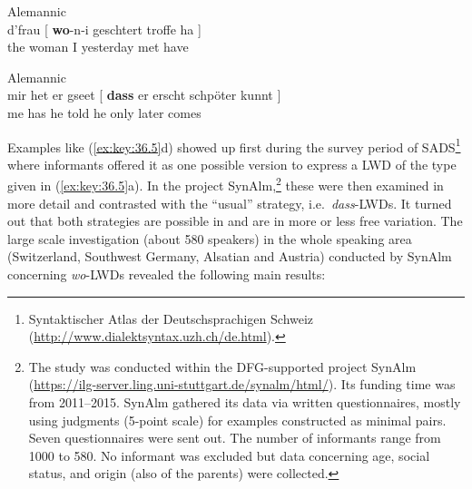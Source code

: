 \documentclass[output=paper]{langsci/langscibook}
\begin{document}
\ea\label{ex:key:36.6} Alemannic\\
    \gll d'frau [ \textbf{wo}-n-i geschtert \underline{\hphantom{2em}} troffe ha ] \\
    {the woman} {} {\Rci{}\hphantom{-n-}I} yesterday met have \\
\z

\ea\label{ex:key:36.7} Alemannic\\
    \gll mir het er gseet [ \textbf{dass} er erscht schpöter kunnt ]\\
        me has he told {} \Cci{} he only later comes \\
\z

Examples like (\ref{ex:key:36.5}d) showed up first during the survey period of
SADS\footnote{Syntaktischer Atlas der Deutschsprachigen Schweiz
(\url{http://www.dialektsyntax.uzh.ch/de.html}).} where informants offered it
as one possible version to express a \gls{LWD} of the type given in
(\ref{ex:key:36.5}a). In the project SynAlm,\footnote{The study was conducted
    within the DFG-supported project SynAlm {\sloppy
    (\url{https://ilg-server.ling.uni-stuttgart.de/synalm/html/})}. Its funding
    time was from 2011--2015. SynAlm gathered its data via written
    questionnaires, mostly using judgments (5-point scale) for examples
    constructed as minimal pairs. Seven questionnaires were sent out. The
number of informants range from 1000 to 580. No informant was excluded but data
concerning age, social status, and origin (also of the parents) were
collected.} these were then examined in more detail and contrasted with the
\enquote{usual} strategy, i.e.\ \emph{dass}-\glspl{LWD}. It turned out that both
strategies are possible in  and are in more or less free
variation. The large scale investigation (about 580 speakers) in the whole
 speaking area (Switzerland, Southwest Germany, Alsatian and
Austria) conducted by SynAlm concerning \emph{wo}-\glspl{LWD} revealed the
following main results:
\end{document}
